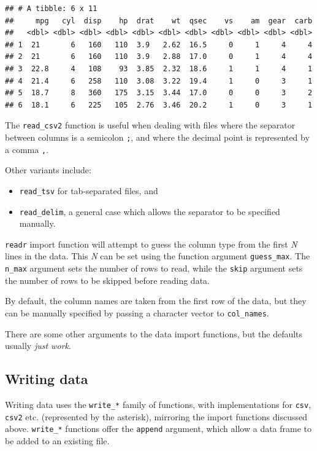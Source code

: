 \documentclass[]{book}
\begin{document}
\begin{verbatim}
## # A tibble: 6 x 11
##     mpg   cyl  disp    hp  drat    wt  qsec    vs    am  gear  carb
##   <dbl> <dbl> <dbl> <dbl> <dbl> <dbl> <dbl> <dbl> <dbl> <dbl> <dbl>
## 1  21       6   160   110  3.9   2.62  16.5     0     1     4     4
## 2  21       6   160   110  3.9   2.88  17.0     0     1     4     4
## 3  22.8     4   108    93  3.85  2.32  18.6     1     1     4     1
## 4  21.4     6   258   110  3.08  3.22  19.4     1     0     3     1
## 5  18.7     8   360   175  3.15  3.44  17.0     0     0     3     2
## 6  18.1     6   225   105  2.76  3.46  20.2     1     0     3     1
\end{verbatim}

The \texttt{read\_csv2} function is useful when dealing with files where the separator between columns is a semicolon \texttt{;}, and where the decimal point is represented by a comma \texttt{,}.

Other variants include:

\begin{itemize}
\item
  \texttt{read\_tsv} for tab-separated files, and
\item
  \texttt{read\_delim}, a general case which allows the separator to be specified manually.
\end{itemize}

\texttt{readr} import function will attempt to guess the column type from the first \emph{N} lines in the data. This \emph{N} can be set using the function argument \texttt{guess\_max}. The \texttt{n\_max} argument sets the number of rows to read, while the \texttt{skip} argument sets the number of rows to be skipped before reading data.

By default, the column names are taken from the first row of the data, but they can be manually specified by passing a character vector to \texttt{col\_names}.

There are some other arguments to the data import functions, but the defaults usually \emph{just work}.

\hypertarget{writing-data}{%
\subsection{Writing data}\label{writing-data}}

Writing data uses the \texttt{write\_*} family of functions, with implementations for \texttt{csv}, \texttt{csv2} etc. (represented by the asterisk), mirroring the import functions discussed above. \texttt{write\_*} functions offer the \texttt{append} argument, which allow a data frame to be added to an existing file.
\end{document}
